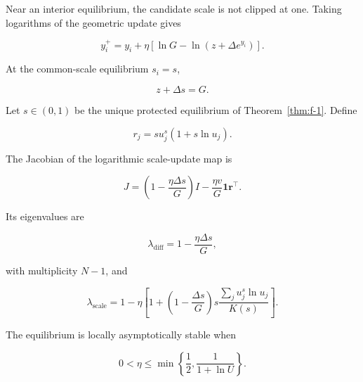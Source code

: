 Near an interior equilibrium, the candidate scale is not clipped at one. Taking logarithms of the geometric update gives

\begin{equation}
\label{eq:app-f-36}
y_i^+
=
y_i+\eta
\left[
\ln G-\ln(z+\Delta e^{y_i})
\right].
\end{equation}

At the common-scale equilibrium \(s_i=s\),

\begin{equation}
\label{eq:app-f-37}
z+\Delta s=G.
\end{equation}

\begin{theorem}
\label{thm:f-2}
Let \(s\in(0,1)\) be the unique protected equilibrium of Theorem~\ref{thm:f-1}. Define

\begin{equation}
\label{eq:app-f-38}
r_j=s u_j^s(1+s\ln u_j).
\end{equation}

The Jacobian of the logarithmic scale-update map is

\begin{equation}
\label{eq:app-f-39}
\boxed{
J=
\left(1-\frac{\eta\Delta s}{G}\right)I
-\frac{\eta v}{G}\mathbf 1\mathbf r^\top.
}
\end{equation}

Its eigenvalues are

\begin{equation}
\label{eq:app-f-40}
\lambda_{\mathrm{diff}}
=
1-\frac{\eta\Delta s}{G},
\end{equation}

with multiplicity \(N-1\), and

\begin{equation}
\label{eq:app-f-41}
\lambda_{\mathrm{scale}}
=
1-\eta
\left[
1+
\left(1-\frac{\Delta s}{G}\right)
s\frac{\sum_j u_j^s\ln u_j}{K(s)}
\right].
\end{equation}

The equilibrium is locally asymptotically stable when

\begin{equation}
\label{eq:app-f-42}
\boxed{
0<\eta\le
\min\left\{\frac12,\frac1{1+\ln U}\right\}.
}
\end{equation}
\end{theorem}

